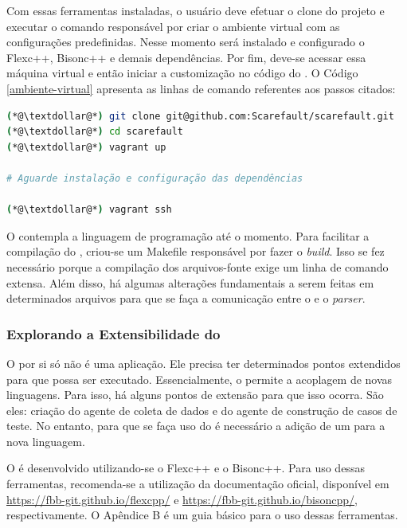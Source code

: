 Com essas ferramentas instaladas, o usuário deve efetuar o clone do projeto
e executar o comando responsável por criar o ambiente virtual com as configurações
predefinidas. Nesse momento será instalado e configurado o \textsf{Flexc++},
\textsf{Bisonc++} e demais dependências. Por fim, deve-se acessar essa máquina
virtual e então iniciar a customização no código do \Scarefault. O Código
\ref{ambiente-virtual} apresenta as linhas de comando referentes aos passos citados:

\begin{lstlisting}[language=bash, label=ambiente-virtual, caption=Levantamento do Ambiente de Desenvolvimento]
(*@\textdollar@*) git clone git@github.com:Scarefault/scarefault.git
(*@\textdollar@*) cd scarefault
(*@\textdollar@*) vagrant up

# Aguarde instalação e configuração das dependências

(*@\textdollar@*) vagrant ssh
\end{lstlisting}

O \scarefault contempla a linguagem de programação \grails até o momento.
Para facilitar a compilação do \Scarefault, criou-se um \textsf{Makefile}
responsável por fazer o \textit{build}. Isso se fez necessário porque a
compilação dos arquivos-fonte exige um linha de comando extensa. Além disso,
há algumas alterações fundamentais a serem feitas em determinados arquivos
para que se faça a comunicação entre o \scanner e o \textit{parser}.

\subsubsection{Explorando a Extensibilidade do \Scarefault}
O \scarefault por si só não é uma aplicação. Ele precisa ter determinados pontos
extendidos para que possa ser executado. Essencialmente, o \scarefault permite a
acoplagem de novas linguagens. Para isso, há alguns pontos de extensão para que
isso ocorra. São eles: criação do agente de coleta de dados e do agente de
construção de casos de teste. No entanto, para que se faça uso do \scarefault é
necessário a adição de um \parser para a nova linguagem.

O \parser é desenvolvido utilizando-se o \textsf{Flexc++} e o \textsf{Bisonc++}. Para
uso dessas ferramentas, recomenda-se a utilização da documentação oficial, disponível
em \url{https://fbb-git.github.io/flexcpp/} e \url{https://fbb-git.github.io/bisoncpp/},
respectivamente. O Apêndice B é um guia básico para o uso dessas ferramentas.

